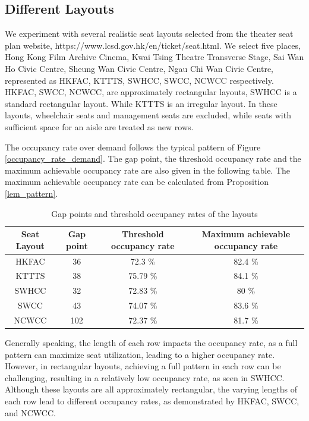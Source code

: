 \subsection*{Different Layouts}
We experiment with several realistic seat layouts selected from the theater seat plan website, https://www.lcsd.gov.hk/en/ticket/seat.html. We select five places, Hong Kong Film Archive Cinema, Kwai Tsing Theatre Transverse Stage, Sai Wan Ho Civic Centre, Sheung Wan Civic Centre, Ngau Chi Wan Civic Centre, represented as HKFAC, KTTTS, SWHCC, SWCC, NCWCC respectively. HKFAC, SWCC, NCWCC, are approximately rectangular layouts, SWHCC is a standard rectangular layout. While KTTTS is an irregular layout. In these layouts, wheelchair seats and management seats are excluded, while seats with sufficient space for an aisle are treated as new rows. 

The occupancy rate over demand follows the typical pattern of Figure \ref{occupancy_rate_demand}. The gap point, the threshold occupancy rate and the maximum achievable occupancy rate are also given in the following table. The maximum achievable occupancy rate can be calculated from Proposition \ref{lem_pattern}.

\begin{table}[ht]
  \centering
  \caption{Gap points and threshold occupancy rates of the layouts}
  \begin{tabular}{c|ccc}
  \hline
   Seat Layout & Gap point & Threshold occupancy rate & Maximum achievable occupancy rate \\
  \hline
   HKFAC & 36 & 72.3 \% & 82.4 \% \\
   KTTTS & 38 & 75.79 \% & 84.1 \% \\
   SWHCC & 32 & 72.83 \% & 80 \% \\
   SWCC & 43 & 74.07 \%  & 83.6 \% \\
   NCWCC & 102 & 72.37 \% & 81.7 \% \\
   \hline
  \end{tabular}
\end{table}

Generally speaking, the length of each row impacts the occupancy rate, as a full pattern can maximize seat utilization, leading to a higher occupancy rate. However, in rectangular layouts, achieving a full pattern in each row can be challenging, resulting in a relatively low occupancy rate, as seen in SWHCC. Although these layouts are all approximately rectangular, the varying lengths of each row lead to different occupancy rates, as demonstrated by HKFAC, SWCC, and NCWCC.

